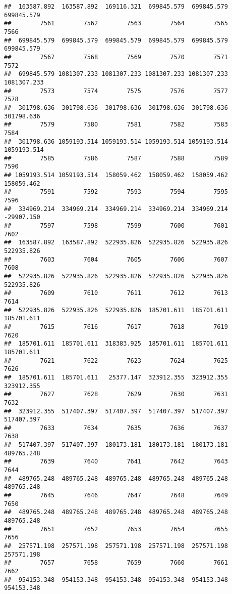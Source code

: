\documentclass[
]{book}
\begin{document}
\begin{verbatim}
##  163587.892  163587.892  169116.321  699845.579  699845.579  699845.579 
##        7561        7562        7563        7564        7565        7566 
##  699845.579  699845.579  699845.579  699845.579  699845.579  699845.579 
##        7567        7568        7569        7570        7571        7572 
##  699845.579 1081307.233 1081307.233 1081307.233 1081307.233 1081307.233 
##        7573        7574        7575        7576        7577        7578 
##  301798.636  301798.636  301798.636  301798.636  301798.636  301798.636 
##        7579        7580        7581        7582        7583        7584 
##  301798.636 1059193.514 1059193.514 1059193.514 1059193.514 1059193.514 
##        7585        7586        7587        7588        7589        7590 
## 1059193.514 1059193.514  158059.462  158059.462  158059.462  158059.462 
##        7591        7592        7593        7594        7595        7596 
##  334969.214  334969.214  334969.214  334969.214  334969.214  -29907.150 
##        7597        7598        7599        7600        7601        7602 
##  163587.892  163587.892  522935.826  522935.826  522935.826  522935.826 
##        7603        7604        7605        7606        7607        7608 
##  522935.826  522935.826  522935.826  522935.826  522935.826  522935.826 
##        7609        7610        7611        7612        7613        7614 
##  522935.826  522935.826  522935.826  185701.611  185701.611  185701.611 
##        7615        7616        7617        7618        7619        7620 
##  185701.611  185701.611  318383.925  185701.611  185701.611  185701.611 
##        7621        7622        7623        7624        7625        7626 
##  185701.611  185701.611   25377.147  323912.355  323912.355  323912.355 
##        7627        7628        7629        7630        7631        7632 
##  323912.355  517407.397  517407.397  517407.397  517407.397  517407.397 
##        7633        7634        7635        7636        7637        7638 
##  517407.397  517407.397  180173.181  180173.181  180173.181  489765.248 
##        7639        7640        7641        7642        7643        7644 
##  489765.248  489765.248  489765.248  489765.248  489765.248  489765.248 
##        7645        7646        7647        7648        7649        7650 
##  489765.248  489765.248  489765.248  489765.248  489765.248  489765.248 
##        7651        7652        7653        7654        7655        7656 
##  257571.198  257571.198  257571.198  257571.198  257571.198  257571.198 
##        7657        7658        7659        7660        7661        7662 
##  954153.348  954153.348  954153.348  954153.348  954153.348  954153.348 

\end{verbatim}
\end{document}
